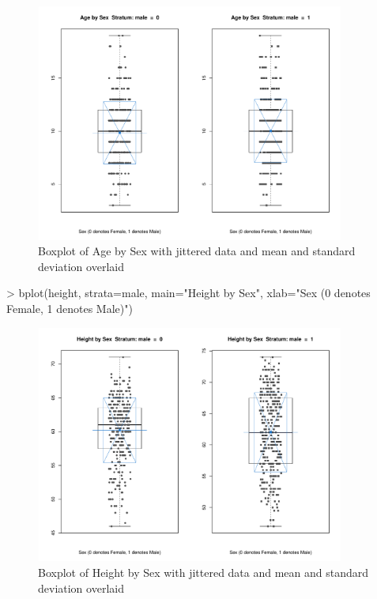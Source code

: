 \documentclass[landscape]{article}
\renewenvironment{Schunk}{\vspace{\topsep}}{\vspace{\topsep}}
\begin{document}
\begin{figure}[h]
\centering
\includegraphics[width=4in, height=3.08in]{fevdoc-agebplot3}
\caption{Boxplot of Age by Sex with jittered data and mean and standard deviation overlaid}
\label{agebplot3}
\end{figure}
\clearpage
\begin{Schunk}
\begin{Sinput}
> bplot(height, strata=male, main="Height by Sex", xlab="Sex (0 denotes Female, 1 denotes Male)")
\end{Sinput}
\end{Schunk}
\begin{figure}[h]
\centering
\includegraphics[width=4in, height=3.08in]{fevdoc-heightbplot3}
\caption{Boxplot of Height by Sex with jittered data and mean and standard deviation overlaid}
\label{heightbplot3}
\end{figure}
\clearpage
\end{document}

